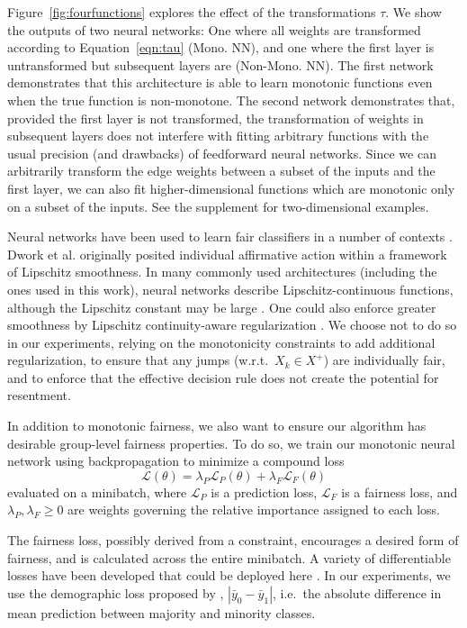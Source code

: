     Figure~\ref{fig:fourfunctions} explores the effect of the transformations $\tau$. We show the outputs of two neural networks: One where all weights are transformed according to Equation~\ref{eqn:tau} (Mono. NN), and one where the first layer is untransformed but subsequent layers are (Non-Mono. NN). The first network demonstrates that this architecture is able to learn monotonic functions even when the true function is non-monotone. The second network demonstrates that, provided the first layer is not transformed, the transformation of weights in subsequent layers does not interfere with fitting arbitrary functions with the usual precision (and drawbacks) of feedforward neural networks. Since we can arbitrarily transform the edge weights between a subset of the inputs and the first layer, we can also fit higher-dimensional functions which are monotonic only on a subset of the inputs.  See the supplement for two-dimensional examples.
  
    Neural networks have been used to learn fair classifiers in a number of contexts \citep{LouSweLiWelZem2016,BeuCheZhaChi2017,MadCrePitZem2018,xu2018fairgan}. Dwork et al. \cite{dwork2012fairness} originally posited individual affirmative action within a framework of Lipschitz smoothness. In many commonly used architectures (including the ones used in this work), neural networks describe Lipschitz-continuous functions, although the Lipschitz constant may be large \citep{Szegedy:2014,gouk2018regularisation,Balan:Singh:Zou:2018}. One could also enforce greater smoothness by Lipschitz continuity-aware regularization \citep{gouk2018regularisation}. We choose not to do so in our experiments, relying on the monotonicity constraints to add additional regularization, to ensure that any jumps (w.r.t.~$X_k\in X^+$) are individually fair, and to enforce that the effective decision rule does not create the potential for resentment.

    In addition to monotonic fairness, we also want to ensure our algorithm has desirable group-level fairness properties. To do so, we train our monotonic neural network using backpropagation to minimize a compound loss
    $$\mathcal{L}(\theta) = \lambda_P \mathcal{L}_P(\theta) + \lambda_F \mathcal{L}_F(\theta)$$
    evaluated on a minibatch, where $\mathcal{L}_P$ is a prediction loss, $\mathcal{L}_F$ is a fairness loss, and $\lambda_P, \lambda_F \ge 0$ are weights governing the relative importance assigned to each loss. 
    
    The fairness loss, possibly derived from a constraint, encourages a desired form of fairness, and is calculated across the entire minibatch. A variety of differentiable losses have been developed that could be deployed here \cite{KamAkaSak2011,KamAkHidSak2012,berk2017convex,zafar2017parity,zafar2017aistats,AgaBeyDudLanWal2018}. In our experiments, we use the demographic loss proposed by \cite{ZemQiSwePitDwo2013}, $|\bar{y}_0 - \bar{y}_1|$, i.e.\ the absolute difference in mean prediction between majority and minority classes.  
    
